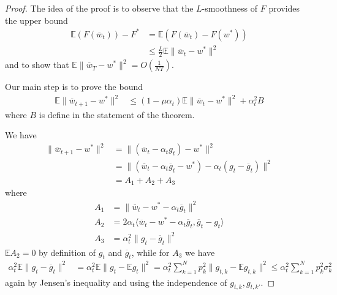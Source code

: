 \begin{proof}
	The idea of the proof is to observe that the $L$-smoothness of $F$
	provides the upper bound
	\begin{align*}
	\mathbb{E}(F(\overline{w}_{t}))-F^{\ast} & =\mathbb{E}(F(\overline{w}_{t})-F(w^{\ast}))\\
	& \leq\frac{L}{2}\mathbb{E}\|\overline{w}_{t}-w^{\ast}\|^{2}
	\end{align*}
	and to show that $\mathbb{E}\|\overline{w}_{T}-w^{\ast}\|^{2}=O(\frac{1}{NT})$. 
	
	Our main step is to prove the bound 
	\begin{align*}
	\mathbb{E}\|\overline{w}_{t+1}-w^{\ast}\|^{2} & \leq(1-\mu\alpha_{t})\mathbb{E}\|\overline{w}_{t}-w^{\ast}\|^{2}+\alpha_{t}^{2}B
	\end{align*}
	where $B$ is define in the statement of the theorem. 
	
	We have 
	\begin{align*}
	\|\overline{w}_{t+1}-w^{\ast}\|^{2} & =\|(\overline{w}_{t}-\alpha_{t}g_{t})-w^{\ast}\|^{2}\\
	& =\|(\overline{w}_{t}-\alpha_{t}\overline{g}_{t}-w^{\ast})-\alpha_{t}(g_{t}-\overline{g}_{t})\|^{2}\\
	& =A_{1}+A_{2}+A_{3}
	\end{align*}
	where 
	\begin{align*}
	A_{1} & =\|\overline{w}_{t}-w^{\ast}-\alpha_{t}\overline{g}_{t}\|^{2}\\
	A_{2} & =2\alpha_{t}\langle\overline{w}_{t}-w^{\ast}-\alpha_{t}\overline{g}_{t},\overline{g}_{t}-g_{t}\rangle\\
	A_{3} & =\alpha_{t}^{2}\|g_{t}-\overline{g}_{t}\|^{2}
	\end{align*}
	$\mathbb{E}A_{2}=0$ by definition of $g_{t}$ and $\overline{g}_{t}$,
	while for $A_{3}$ we have
	\begin{align*}
	\alpha_{t}^{2}\mathbb{E}\|g_{t}-\overline{g}_{t}\|^{2} & =\alpha_{t}^{2}\mathbb{E}\|g_{t}-\mathbb{E}g_{t}\|^{2}=\alpha_{t}^{2}\sum_{k=1}^{N}p_{k}^{2}\|g_{t,k}-\mathbb{E}g_{t,k}\|^{2}\leq\alpha_{t}^{2}\sum_{k=1}^{N}p_{k}^{2}\sigma_{k}^{2}
	\end{align*}
	again by Jensen's inequality and using the independence of $g_{t,k},g_{t,k'}$. 
	

\end{proof}
